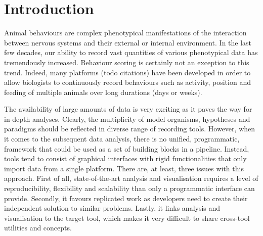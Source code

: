 \documentclass[10pt,letterpaper]{article}
\begin{document}

\linenumbers

\section*{Introduction}

Animal behaviours are complex phenotypical manifestations of the interaction between nervous systems and their external or internal environment.
In the last few decades, our ability to record vast quantities of various phenotypical data has tremendously increased.
Behaviour scoring is certainly not an exception to this trend.
Indeed, many platforms (todo citations) have been developed in order to allow biologists to continuously record behaviours such as activity, position and feeding of multiple animals over long durations (days or weeks).

The availability of large amounts of data is very exciting as it paves the way for in-depth analyses.
Clearly, the multiplicity of model organisms, hypotheses and paradigms should be reflected in  diverse range of recording tools.
However, when it comes to the subsequent data analysis, there is no unified, programmatic, framework that could be used as a set of building blocks in a pipeline.
Instead, tools tend to consist of graphical interfaces with rigid functionalities that only import data from a single platform.
There are, at least, three issues with this approach.
First of all, state-of-the-art analysis and visualisation requires a level of reproducibility, flexibility and scalability than only a programmatic interface can provide.
Secondly, it favours replicated work as developers need to create their independent solution to similar problems.
Lastly, it links analysis and visualisation to the target tool, which makes it very difficult to share cross-tool utilities and concepts.
\end{document}
